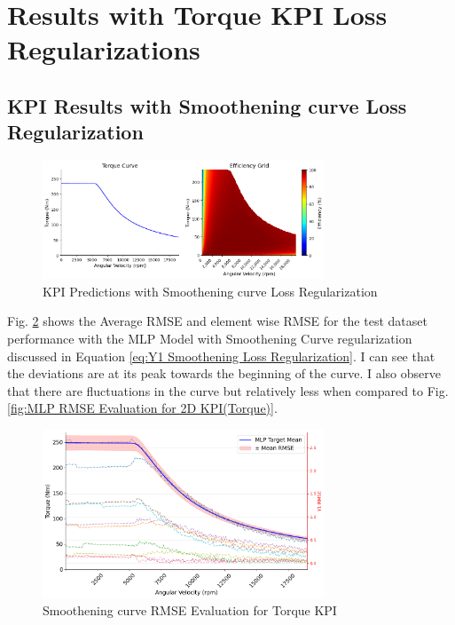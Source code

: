 \documentclass{report} %
\begin{document}
\section{Results with Torque KPI Loss Regularizations}\label{sec:Results with Torque KPI Loss Regularizations}

\subsection{KPI Results with Smoothening curve Loss Regularization}\label{subsec:KPI Results with Smoothening curve Loss Regularization}

\begin{figure}[H]
    \centering
    \includegraphics[width=0.75\textwidth]{./ReportImages/predictions_Smoothening.png} 
    \caption{KPI Predictions with Smoothening curve Loss Regularization} 
    \label{KPI Predictions with Smoothening curve Loss Regularization}
\end{figure}

Fig. \ref{fig:Smoothening Torque RMSE Evaluation for 2D KPI(Torque)} shows the Average \ac{RMSE} and element wise \ac{RMSE} for the test dataset performance 
with the MLP Model with Smoothening Curve regularization discussed in Equation \ref{eq:Y1 Smoothening Loss Regularization}.
I can see that the deviations are at its peak towards the beginning of the curve. 
I also observe that there are fluctuations in the curve but relatively less when compared to Fig. \ref{fig:MLP RMSE Evaluation for 2D KPI(Torque)}.
\begin{figure}[H]
    \centering
    \includegraphics[width=0.75\textwidth]{./ReportImages/RMSE_MLP_Smoothening_y1.png} 
    \caption{Smoothening curve \ac{RMSE} Evaluation for Torque \ac{KPI}} 
    \label{fig:Smoothening Torque RMSE Evaluation for 2D KPI(Torque)}
\end{figure}
\end{document}
